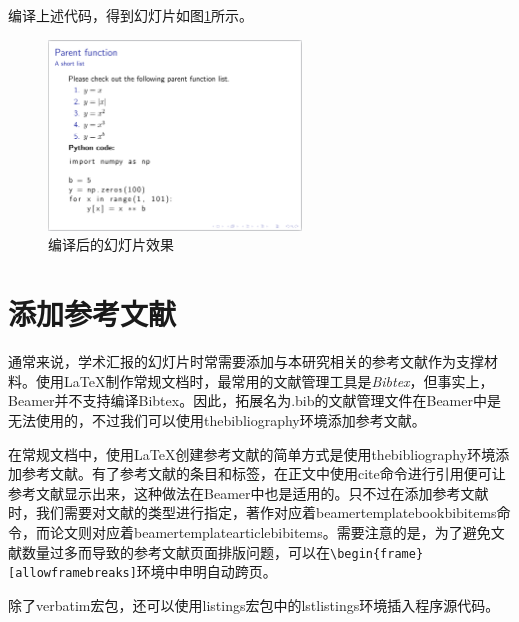编译上述代码，得到幻灯片如图\ref{fig:938}所示。

\begin{figure}[htbp]
    \centering
    \includegraphics[width = 0.6\textwidth]{images/ch_9/example16.png}
    \caption{编译后的幻灯片效果}
    \label{fig:938}
\end{figure}

\section{添加参考文献}

通常来说，学术汇报的幻灯片时常需要添加与本研究相关的参考文献作为支撑材料。使用LaTeX制作常规文档时，最常用的文献管理工具是\emph{Bibtex}，但事实上，Beamer并不支持编译Bibtex。因此，拓展名为.bib的文献管理文件在Beamer中是无法使用的，不过我们可以使用thebibliography环境添加参考文献。

在常规文档中，使用LaTeX创建参考文献的简单方式是使用thebibliography环境添加参考文献。有了参考文献的条目和标签，在正文中使用cite命令进行引用便可让参考文献显示出来，这种做法在Beamer中也是适用的。只不过在添加参考文献时，我们需要对文献的类型进行指定，著作对应着beamertemplatebookbibitems命令，而论文则对应着beamertemplatearticlebibitems。需要注意的是，为了避免文献数量过多而导致的参考文献页面排版问题，可以在\texttt{\textbackslash{}begin\{frame\}[allowframebreaks]}环境中申明自动跨页。

除了verbatim宏包，还可以使用listings宏包中的lstlistings环境插入程序源代码。

